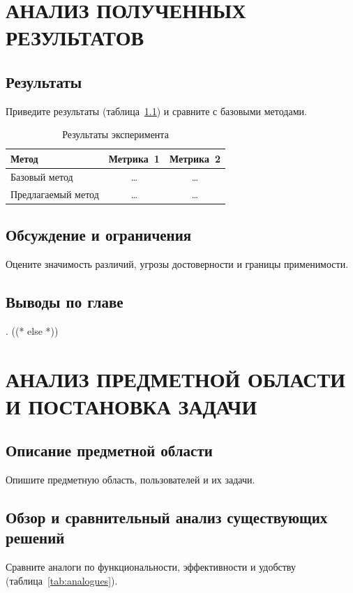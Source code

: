 \documentclass[12pt,a4paper]{extreport}
\begin{document}
\clearpage
\chapter{АНАЛИЗ ПОЛУЧЕННЫХ РЕЗУЛЬТАТОВ}
\section{Результаты}
Приведите результаты (таблица~\ref{tab:results}) и сравните с базовыми методами.

\begin{table}[H]
\caption{Результаты эксперимента}
\label{tab:results}
\centering
\begin{tabular}{|>{\raggedright\arraybackslash}p{5cm}|c|c|}
\hline
\textbf{Метод} & \textbf{Метрика~1} & \textbf{Метрика~2} \\
\hline
Базовый метод      & \ldots & \ldots \\
\hline
Предлагаемый метод & \ldots & \ldots \\
\hline
\end{tabular}
\end{table}

\section{Обсуждение и ограничения}
Оцените значимость различий, угрозы достоверности и границы применимости.

\section{Выводы по главе}
.
((* else *))
\clearpage
\chapter{АНАЛИЗ ПРЕДМЕТНОЙ ОБЛАСТИ И ПОСТАНОВКА ЗАДАЧИ}
\section{Описание предметной области}
Опишите предметную область, пользователей и их задачи.

\section{Обзор и сравнительный анализ существующих решений}
Сравните аналоги по функциональности, эффективности и удобству
(таблица~\ref{tab:analogues}).
\end{document}
